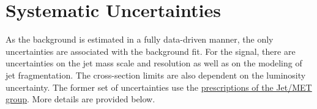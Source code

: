 %

\section{Systematic Uncertainties}
\label{sec:CWoLa:systs}

As the background is estimated in a fully data-driven manner, the only uncertainties are associated with the background fit.
For the signal, there are uncertainties on the jet mass scale and resolution as well as on the modeling of jet fragmentation.
The cross-section limits are also dependent on the luminosity uncertainty.
The former set of uncertainties use the \href{https://twiki.cern.ch/twiki/bin/view/AtlasProtected/JetUncertaintiesRel21Summer2019LargeR}{prescriptions of the Jet/MET group}.  More details are provided below.

